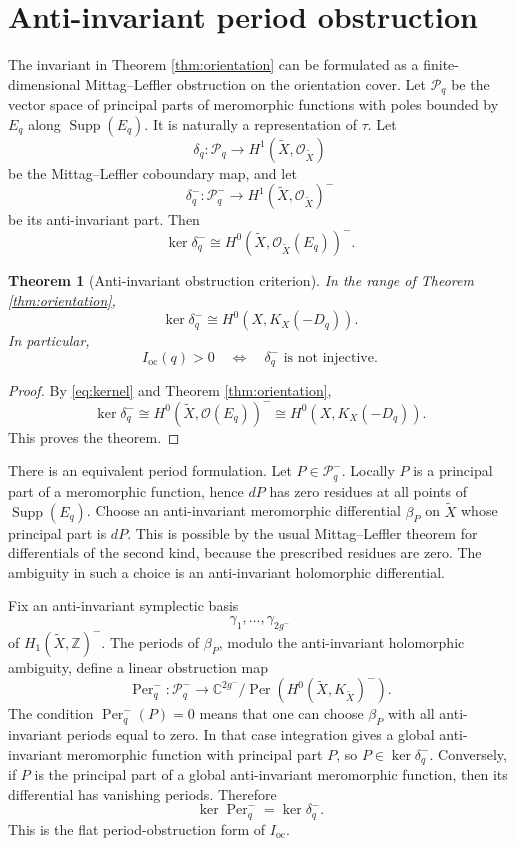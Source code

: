 \documentclass[11pt]{article}
\newtheorem{theorem}{Theorem}[section]
\theoremstyle{remark}
\newcommand{\Xt}{\widetilde X}
\newcommand{\OO}{\mathcal O}
\newcommand{\PP}{\mathcal P}
\newcommand{\Ioc}{I_{\mathrm{oc}}}
\DeclareMathOperator{\Per}{Per}
\DeclareMathOperator{\Supp}{Supp}
\begin{document}
\section{Anti-invariant period obstruction}
The invariant in Theorem \ref{thm:orientation} can be formulated as a finite-dimensional Mittag--Leffler obstruction
on the orientation cover. Let $\PP_q$ be the vector space of principal parts of meromorphic functions
with poles bounded by $E_q$ along $\Supp(E_q)$. It is naturally a representation of $\tau$. Let
\[
\delta_q:\PP_q\longrightarrow H^1(\Xt,\OO_{\Xt})
\]
be the Mittag--Leffler coboundary map, and let
\[
\delta_q^-:\PP_q^-\longrightarrow H^1(\Xt,\OO_{\Xt})^-
\]
be its anti-invariant part. Then
\begin{equation}\label{eq:kernel}
\ker\delta_q^-\cong H^0(\Xt,\OO_{\Xt}(E_q))^-.
\end{equation}
\begin{theorem}[Anti-invariant obstruction criterion]\label{thm:obstruction}
In the range of Theorem \ref{thm:orientation},
\[
\ker\delta_q^-\cong H^0(X,K_X(-D_q)).
\]
In particular,
\[
\Ioc(q)>0\quad\Longleftrightarrow\quad\delta_q^-\text{ is not injective}.
\]
\end{theorem}
\begin{proof}
By \eqref{eq:kernel} and Theorem \ref{thm:orientation},
\[
\ker\delta_q^-\cong H^0(\Xt,\OO(E_q))^-\cong H^0(X,K_X(-D_q)).
\]
This proves the theorem.
\end{proof}

There is an equivalent period formulation. Let $P\in\PP_q^-$. Locally $P$ is a principal part of a
meromorphic function, hence $dP$ has zero residues at all points of $\Supp(E_q)$. Choose an anti-invariant
meromorphic differential $\beta_P$ on $\Xt$ whose principal part is $dP$. This is possible by the
usual Mittag--Leffler theorem for differentials of the second kind, because the prescribed residues
are zero. The ambiguity in such a choice is an anti-invariant holomorphic differential.

Fix an anti-invariant symplectic basis
\[
\gamma_1,\ldots,\gamma_{2g^-}
\]
of $H_1(\Xt,\mathbb Z)^-$. The periods of $\beta_P$, modulo the anti-invariant holomorphic ambiguity, define a
linear obstruction map
\[
\Per_q^-:\PP_q^-\longrightarrow
\mathbb C^{2g^-}/\Per(H^0(\Xt,K_{\Xt})^-).
\]
The condition $\Per_q^-(P)=0$ means that one can choose $\beta_P$ with all anti-invariant periods equal to
zero. In that case integration gives a global anti-invariant meromorphic function with principal
part $P$, so $P\in\ker\delta_q^-$. Conversely, if $P$ is the principal part of a global anti-invariant meromorphic
function, then its differential has vanishing periods. Therefore
\[
\ker\Per_q^-=\ker\delta_q^-.
\]
This is the flat period-obstruction form of $\Ioc$.
\end{document}
